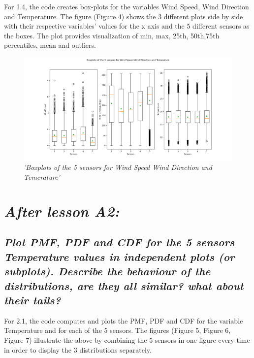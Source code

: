 \documentclass[a4paper,12pt]{article}
\begin{document}
For 1.4, the code creates box-plots for the 
variables Wind Speed, Wind Direction and Temperature. 
The figure (Figure 4) shows the 3 different plots side by side 
with their respective variables’ values for the x axis and the 5 
different sensors as the boxes. The plot provides visualization 
of min, max, 25th, 50th,75th percentiles, mean and outliers.




\begin{figure}[H]
\centering
\includegraphics[width=\textwidth]{Graphs/Boxplots_of_the_5_sensors_for_Temerature,_Wind_Speed_and_Wind_Direction.png}
\caption{\it'Boxplots of the 5 sensors for Wind Speed Wind Direction and Temerature'}
\end{figure}




\section{\it After lesson A2:}
\subsection{\it Plot PMF, PDF and CDF for the 5 sensors Temperature values in independent plots (or subplots). Describe the behaviour of the distributions, are they all similar? what about their tails?}



For 2.1, the code computes and plots the PMF, PDF and 
CDF for the variable Temperature and for each of the 5 sensors. 
The figures (Figure 5, Figure 6, Figure 7) illustrate the above by combining the 5 sensors
in one figure every time in order to display the 3 distributions separately.
\end{document}
